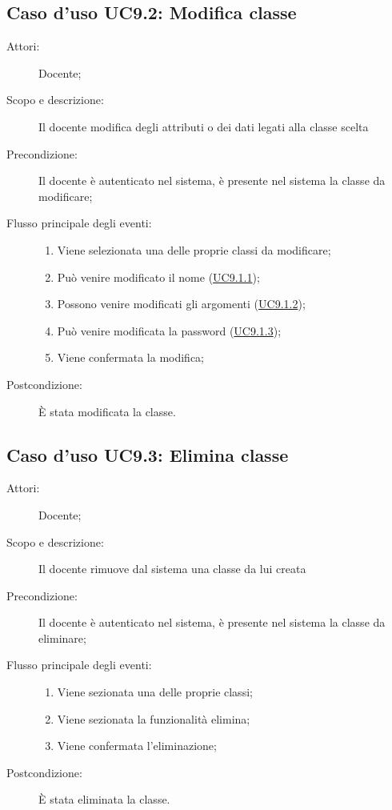 \subsection{Caso d'uso UC9.2: Modifica classe}\begin{description}
\item[Attori:] Docente;
\item[Scopo e descrizione:] Il docente modifica degli attributi o dei dati legati alla classe scelta
      \item[Precondizione:] Il docente è autenticato nel sistema, è presente nel sistema la classe da modificare;

        \item[Flusso principale degli eventi:] \begin{enumerate}
          \item Viene selezionata una delle proprie classi da modificare;
          \item Può venire modificato il nome (\hyperlink{UC9.1.1}{UC9.1.1});
          \item Possono venire modificati gli argomenti (\hyperlink{UC9.1.2}{UC9.1.2});
          \item Può venire modificata la password (\hyperlink{UC9.1.3}{UC9.1.3});
          \item Viene confermata la modifica;

      \end{enumerate}
    \item[Postcondizione:] È stata modificata la classe.
  \end{description}
\hypertarget{UC9.3}{}
\subsection{Caso d'uso UC9.3: Elimina classe}\begin{description}
\item[Attori:] Docente;
\item[Scopo e descrizione:] Il docente rimuove dal sistema una classe da lui creata 
      \item[Precondizione:] Il docente è autenticato nel sistema, è presente nel sistema la classe da eliminare;

        \item[Flusso principale degli eventi:] \begin{enumerate}
          \item Viene sezionata una delle proprie classi;
          \item Viene sezionata la funzionalità elimina;
          \item Viene confermata l'eliminazione;

      \end{enumerate}
    \item[Postcondizione:] È stata eliminata la classe.
  \end{description}
\hypertarget{UC9.4}{}
